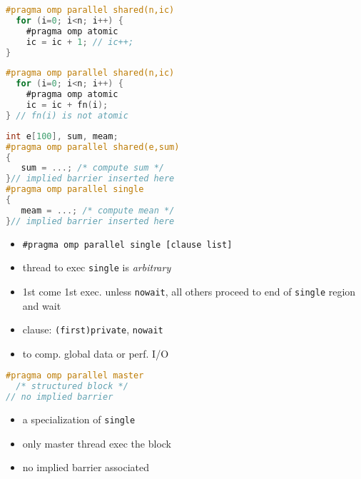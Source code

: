 \begin{minipage}{0.5\linewidth}
\begin{lstlisting}[language=C,xrightmargin=2pt]
#pragma omp parallel shared(n,ic)
  for (i=0; i<n; i++) {
    #pragma omp atomic
    ic = ic + 1; // ic++;
}
\end{lstlisting}
\end{minipage}
\begin{minipage}{0.5\linewidth}
\begin{lstlisting}[language=C,xleftmargin=4pt]
#pragma omp parallel shared(n,ic)
  for (i=0; i<n; i++) {
    #pragma omp atomic
    ic = ic + fn(i);
} // fn(i) is not atomic
\end{lstlisting}
\end{minipage}
\begin{minipage}{0.5\linewidth}
\begin{lstlisting}[language=C,xrightmargin=2pt]
int e[100], sum, meam;
#pragma omp parallel shared(e,sum)
{
   sum = ...; /* compute sum */
}// implied barrier inserted here
#pragma omp parallel single
{
   meam = ...; /* compute mean */
}// implied barrier inserted here
\end{lstlisting}
\end{minipage}
\begin{minipage}{0.5\linewidth}
  \flushleft
  \begin{itemize}
  \item \texttt{\#pragma omp parallel single [clause list]}
  \item thread to exec \texttt{single} is \emph{arbitrary}
  \item 1st come 1st exec.  unless \texttt{nowait}, all others proceed to end of \texttt{single} region and wait
  \item clause: \texttt{(first)private}, \texttt{nowait}
  \item to comp. global data or perf. I/O
\end{itemize}
\end{minipage}
\begin{minipage}{0.5\linewidth}
\begin{lstlisting}[language=C,xrightmargin=2pt]
#pragma omp parallel master
  /* structured block */
// no implied barrier
\end{lstlisting}
\end{minipage}
\begin{minipage}{0.5\linewidth}
  \flushleft
  \begin{itemize}
  \item a specialization of \texttt{single}
  \item only master thread exec the block
  \item no implied barrier associated
\end{itemize}
\end{minipage}
